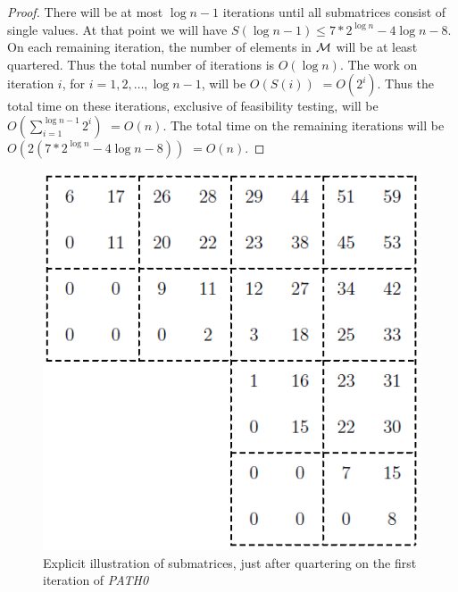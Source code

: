 \begin{proof}
There will be at most $\log n -1$ iterations until all submatrices consist
of single values.
At that point we will have
$S(\log n -1) \leq 7*2^{\log n}-4\log n -8$.
On each remaining iteration,
the number of elements in $\cal M$ will be at least quartered.
Thus the total number of iterations is $O(\log n)$.
The work on iteration $i$, for $i = 1, 2, \ldots ,\log n -1$,
will be $O(S(i))$ $= O(2^i)$.
Thus the total time on these iterations, exclusive of feasibility testing,
will be $O(\sum_{i=1}^{\log n -1}2^i)$ $=O(n)$.
The total time on the remaining iterations will be
$O(2(7*2^{\log n}-4\log n -8))$ $=O(n)$.
\end{proof}

\begin{figure}[thb]
\begin{center}
\includegraphics{fig2p2}
\end{center}
\caption{\small Explicit illustration of submatrices, just after quartering on the first iteration of {\it PATH0}}
\label{fig2p2}
\end{figure}

